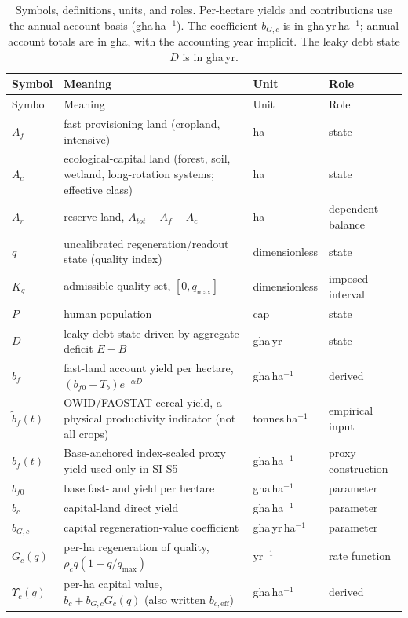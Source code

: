 \documentclass[11pt,a4paper]{article}
\newcommand{\Ups}{\Upsilon_c}
\begin{document}
\begin{longtable}{>{\raggedright\arraybackslash}p{}>{\raggedright\arraybackslash}p{}>{\raggedright\arraybackslash}p{}>{\raggedright\arraybackslash}p{}}
\caption{Symbols, definitions, units, and roles. Per-hectare yields and contributions use the annual account basis (gha\,ha$^{-1}$). The coefficient $b_{G,c}$ is in gha\,yr\,ha$^{-1}$; annual account totals are in gha, with the accounting year implicit. The leaky debt state $D$ is in gha\,yr.}\label{tab:si_symbols}\\
\toprule
Symbol & Meaning & Unit & Role \\
\midrule
\endfirsthead
\toprule
Symbol & Meaning & Unit & Role \\
\midrule
\endhead
$A_f$ & fast provisioning land (cropland, intensive) & ha & state \\
$A_c$ & ecological-capital land (forest, soil, wetland, long-rotation systems; effective class) & ha & state \\
$A_r$ & reserve land, $A_{tot}-A_f-A_c$ & ha & dependent balance \\
$q$ & uncalibrated regeneration/readout state (quality index) & dimensionless & state \\
$K_q$ & admissible quality set, $[0,q_{\max}]$ & dimensionless & imposed interval \\
$P$ & human population & cap & state \\
$D$ & leaky-debt state driven by aggregate deficit $E-B$ & gha\,yr & state \\
$b_f$ & fast-land account yield per hectare, $(b_{f0}+T_b)e^{-\alpha D}$ & gha\,ha$^{-1}$ & derived \\
$\tilde b_f(t)$ & OWID/FAOSTAT cereal yield, a physical productivity indicator (not all crops) & tonnes\,ha$^{-1}$ & empirical input \\
$\hat b_f(t)$ & Base-anchored index-scaled proxy yield used only in SI S5 & gha\,ha$^{-1}$ & proxy construction \\
$b_{f0}$ & base fast-land yield per hectare & gha\,ha$^{-1}$ & parameter \\
$b_c$ & capital-land direct yield & gha\,ha$^{-1}$ & parameter \\
$b_{G,c}$ & capital regeneration-value coefficient & gha\,yr\,ha$^{-1}$ & parameter \\
$G_c(q)$ & per-ha regeneration of quality, $\rho_cq(1-q/q_{\max})$ & yr$^{-1}$ & rate function \\
$\Ups(q)$ & per-ha capital value, $b_c+b_{G,c}G_c(q)$ (also written $b_{c,\mathrm{eff}}$) & gha\,ha$^{-1}$ & derived \\

\end{longtable}
\end{document}
